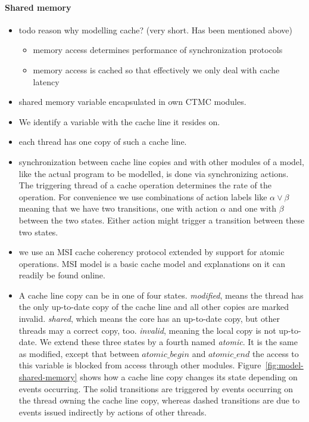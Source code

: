 \documentclass[a4paper, 10pt]{article}
\begin{document}
\paragraph{Shared memory}
\label{sssec:analysis-modelchecking-modelling-shared-memory}
\begin{itemize}
	\item todo reason why modelling cache? (very short. Has been mentioned above)
		\begin{itemize}
			\item memory access determines performance of synchronization protocols
			\item memory access is cached so that effectively we only deal with cache latency
		\end{itemize}
	\item shared memory variable encapsulated in own CTMC modules.
	\item We identify a variable with the cache line it resides on.
	\item each thread has one copy of such a cache line.
	\item synchronization between cache line copies and with other modules of a model, like the actual program to be modelled, is done via synchronizing actions. The triggering thread of a cache operation determines the rate of the operation. For convenience we use combinations of action labels like $\alpha \lor \beta$ meaning that we have two transitions, one with action $\alpha$ and one with $\beta$ between the two states. Either action might trigger a transition between these two states.
	\item we use an MSI cache coherency protocol extended by support for atomic operations. MSI model is a basic cache model and explanations on it can readily be found online\cite{msi}.
	\item A cache line copy can be in one of four states. \emph{modified}, means the thread has the only up-to-date copy of the cache line and all other copies are marked invalid. \emph{shared}, which means the core has an up-to-date copy, but other threads may a correct copy, too. \emph{invalid}, meaning the local copy is not up-to-date. We extend these three states by a fourth named \emph{atomic}. It is the same as modified, except that between $\mathit{atomic\_begin}$ and $\mathit{atomic\_end}$ the access to this variable is blocked from access through other modules. Figure~\ref{fig:model-shared-memory} shows how a cache line copy changes its state depending on events occurring. The solid transitions are triggered by events occurring on the thread owning the cache line copy, whereas dashed transitions are due to events issued indirectly by actions of other threads.

\end{itemize}
\end{document}
